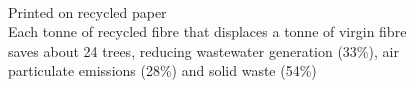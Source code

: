 \newpage
\thispagestyle{empty}

\vspace*{\fill}
    \begin{center}
      {\fontsize{50}{60} \faRecycle}\\[0.5cm]
      {\Large Printed on recycled paper}\\[0.4cm]
      {\color{dimgray} Each tonne of recycled fibre that displaces a tonne of virgin fibre \\ saves about 24 trees, reducing wastewater generation (33\%), air \\ particulate emissions (28\%) and solid waste (54\%)}\\[0.4cm]
    \end{center}
    \vspace*{\fill}